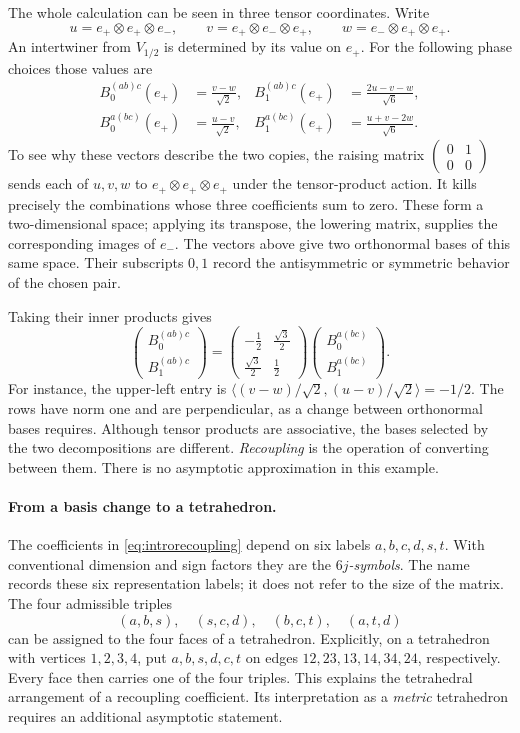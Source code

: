 The whole calculation can be seen in three tensor coordinates.
Write
\[
 u=e_+\otimes e_+\otimes e_-,\qquad
 v=e_+\otimes e_-\otimes e_+,\qquad
 w=e_-\otimes e_+\otimes e_+.
\]
An intertwiner from $V_{1/2}$ is determined by its value on $e_+$.
For the following phase choices those values are
\[
 \begin{aligned}
 B_0^{(ab)c}(e_+)&=\frac{v-w}{\sqrt2},
 &B_1^{(ab)c}(e_+)&=\frac{2u-v-w}{\sqrt6},\\
 B_0^{a(bc)}(e_+)&=\frac{u-v}{\sqrt2},
 &B_1^{a(bc)}(e_+)&=\frac{u+v-2w}{\sqrt6}.
 \end{aligned}
\]
To see why these vectors describe the two copies, the raising
matrix $\left(\begin{smallmatrix}0&1\\0&0\end{smallmatrix}\right)$
sends each of $u,v,w$ to $e_+\otimes e_+\otimes e_+$ under the
tensor-product action. It kills precisely the combinations whose
three coefficients sum to zero. These form a two-dimensional
space; applying its transpose, the lowering matrix, supplies the corresponding
images of $e_-$. The vectors above give two orthonormal bases
of this same space. Their subscripts $0,1$ record the
antisymmetric or symmetric behavior of the chosen pair.

Taking their inner products gives
\[
 \begin{pmatrix}B_0^{(ab)c}\\ B_1^{(ab)c}\end{pmatrix}
 =\begin{pmatrix}
 -\tfrac12&\tfrac{\sqrt3}{2}\\
 \tfrac{\sqrt3}{2}&\tfrac12
 \end{pmatrix}
 \begin{pmatrix}B_0^{a(bc)}\\ B_1^{a(bc)}\end{pmatrix}.
\]
For instance, the upper-left entry is
$\langle(v-w)/\sqrt2,(u-v)/\sqrt2\rangle=-1/2$.
The rows have norm one and are perpendicular, as a change between
orthonormal bases requires. Although tensor products are associative,
the bases selected by the two decompositions are different.
\emph{Recoupling} is the operation of converting between them.
There is no asymptotic approximation in this example.

\paragraph{From a basis change to a tetrahedron.}
The coefficients in \eqref{eq:introrecoupling} depend on six
labels $a,b,c,d,s,t$. With conventional dimension and sign factors
they are the \emph{$6j$-symbols}. The name records these six
representation labels; it does not refer to the size of the matrix.
The four admissible triples
\[
 (a,b,s),\quad(s,c,d),\quad(b,c,t),\quad(a,t,d)
\]
can be assigned to the four faces of a tetrahedron. Explicitly,
on a tetrahedron with vertices $1,2,3,4$, put
$a,b,s,d,c,t$ on edges $12,23,13,14,34,24$, respectively.
Every face then carries one of the four triples.
This explains the tetrahedral arrangement of a recoupling coefficient.
Its interpretation as a \emph{metric} tetrahedron requires an
additional asymptotic statement.

